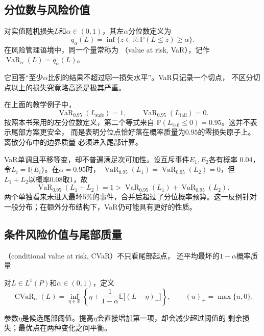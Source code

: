 \subsection{分位数与风险价值}
\begin{definition}[风险价值]
\label{def:decision-value-at-risk}
对实值随机损失$L$和\(\alpha\in(0,1)\)，其左\(\alpha\)分位数定义为
\begin{equation}
  q_\alpha(L)
  =
  \inf\{z\in\mathbb{R}:\mathbb{P}(L\leq z)\geq\alpha\}.
  \label{eq:decision-loss-quantile}
\end{equation}
在风险管理语境中，同一个量常称为
（value at risk, VaR），记作
\(\operatorname{VaR}_{\alpha}(L)=q_\alpha(L)\)。
\end{definition}
它回答“至少\(\alpha\)比例的结果不超过哪一损失水平”。VaR只记录一个切点，
不区分切点以上的损失究竟略高还是极其严重。

在上面的教学例子中，
\[
  \operatorname{VaR}_{0.95}(L_{\mathrm{safe}})=1,
  \qquad
  \operatorname{VaR}_{0.95}(L_{\mathrm{tail}})=0.
\]
按照本书采用的左分位数定义，第二个等式来自
\(\mathbb{P}(L_{\mathrm{tail}}\leq0)=0.95\)。这并不表示尾部方案更安全，
而是表明分位点恰好落在概率质量为\(0.95\)的零损失原子上。离散分布中的边界质量
必须进入尾部计算。

VaR单调且平移等变，却不普遍满足次可加性。设互斥事件\(E_1,E_2\)各有概率
\(0.04\)，令\(L_i=\mathbb{I}\{E_i\}\)。在\(\alpha=0.95\)时，
\(\operatorname{VaR}_{0.95}(L_1)=\operatorname{VaR}_{0.95}(L_2)=0\)，但
\(L_1+L_2\)以概率\(0.08\)取\(1\)，故
\[
  \operatorname{VaR}_{0.95}(L_1+L_2)=1
  >
  \operatorname{VaR}_{0.95}(L_1)
  +
  \operatorname{VaR}_{0.95}(L_2).
\]
两个单独看来未进入最坏\(5\%\)的事件，合并后超过了分位概率预算。这一反例针对
一般分布；在额外分布结构下，VaR仍可能具有更好的性质。

\subsection{条件风险价值与尾部质量}
（conditional value at risk, CVaR）不只看尾部起点，
还平均最坏的\(1-\alpha\)概率质量
\begin{definition}[条件风险价值]
\label{def:decision-conditional-value-at-risk}
对$L\in L^1(P)$和$\alpha\in(0,1)$，定义
\begin{equation}
  \operatorname{CVaR}_{\alpha}(L)
  =
  \inf_{\eta\in\mathbb{R}}
  \left\{
    \eta+
    \frac{1}{1-\alpha}
    \mathbb{E}\bigl[(L-\eta)_+\bigr]
  \right\},
  \qquad
  (u)_+=\max\{u,0\}.
  \label{eq:decision-cvar-optimization}
\end{equation}
\end{definition}
参数\(\eta\)是候选尾部阈值。提高\(\eta\)会直接增加第一项，却会减少超过阈值的
剩余损失；最优点在两种变化之间平衡。

